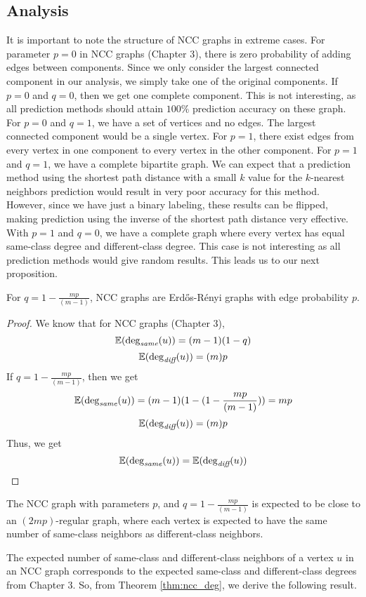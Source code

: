 \subsection{Analysis}
It is important to note the structure of NCC graphs in extreme cases.
For parameter $p=0$ in NCC graphs (Chapter 3), there is zero probability
of adding edges between components. Since we only consider the largest 
connected component in our analysis, we simply take one of the original components.
If $p=0$ and $q=0$, then we get one complete component. This is not 
interesting, as all prediction methods should attain $100\%$ prediction 
accuracy on these graph. For $p=0$ and $q=1$, we have a set of vertices and no edges. The largest 
connected component would be a single vertex. For $p=1$, there exist edges
from every vertex in one component to every vertex in the other component.
For $p=1$ and $q=1$, we have a complete bipartite graph. We can expect that
a prediction method using the shortest path distance with a small $k$ value
for the $k$-nearest neighbors prediction would result in very poor accuracy
for this method. However, since we have just a binary labeling, these
results can be flipped, making prediction using the inverse of the shortest 
path distance very effective.
With $p=1$ and $q=0$, we have a complete graph where every vertex has equal
same-class degree and different-class degree. This case is not interesting
as all prediction methods would give random results. This leads us to our
next proposition.

\begin{proposition}
For $q = 1 - \frac{mp}{(m-1)}$, NCC graphs are Erd\H{o}s-R\'{e}nyi graphs
with edge probability $p$.
\end{proposition}
\begin{proof}
We know that for NCC graphs (Chapter 3),
$$\mathbb{E}(\deg_{\textit{same}}(u)) = (m-1)(1-q)$$
$$\mathbb{E}(\deg_{\textit{diff}}(u)) = (m)p$$
If $q = 1 - \frac{mp}{(m-1)}$, then we get
$$\mathbb{E}(\deg_{\textit{same}}(u)) = (m-1)(1 - (1 - \frac{mp}{(m-1)})) = mp$$
$$\mathbb{E}(\deg_{\textit{diff}}(u)) = (m)p$$
Thus, we get
$$\mathbb{E}(\deg_{\textit{same}}(u)) = \mathbb{E}(\deg_{\textit{diff}}(u))$$
\end{proof}

The NCC graph with parameters $p$, and $q = 1 - \frac{mp}{(m-1)}$ is expected
to be close to an $(2mp)$-regular graph, where each vertex is expected to 
have the same number of same-class neighbors as different-class neighbors.

The expected number of same-class and different-class neighbors of a vertex
$u$ in an NCC graph corresponds to the expected same-class and 
different-class degrees from Chapter 3. So, from Theorem \ref{thm:ncc_deg}, 
we derive the following result.

